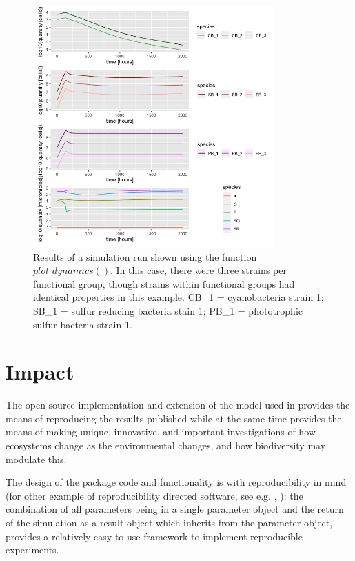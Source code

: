 \documentclass[]{elsarticle} %
\begin{document}
\begin{figure}

{\centering \includegraphics[width=350px]{figures/ug_three_strains_dynamics} 

}

\caption{Results of a simulation run shown using the function $plot\_dynamics()$. In this case, there were three strains per functional group, though strains within functional groups had identical properties in this example. CB\_1 = cyanobacteria strain 1; SB\_1 = sulfur reducing bacteria stain 1; PB\_1 = phototrophic sulfur bacteria strain 1.}\label{fig:plot-dynamics}
\end{figure}

\hypertarget{impact}{%
\section{Impact}\label{impact}}

The open source implementation and extension of the model used in \citet{Bush2017} provides the means of reproducing the results published while at the same time provides the means of making unique, innovative, and important investigations of how ecosystems change as the environmental changes, and how biodiversity may modulate this.

The design of the package code and functionality is with reproducibility in mind (for other example of reproducibility directed software, see e.g. \citet{Correndo2023}, \citet{Spillner2022or} \citet{Fox2020}): the combination of all parameters being in a single parameter object and the return of the simulation as a result object which inherits from the parameter object, provides a relatively easy-to-use framework to implement reproducible experiments.
\end{document}
